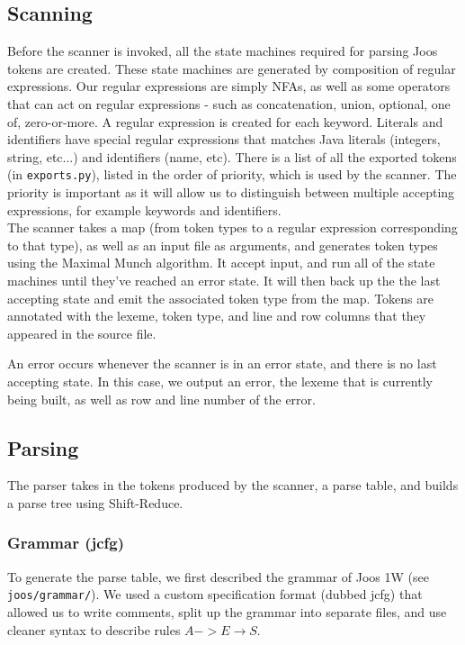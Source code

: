 \documentclass[12pt, a4paper]{article}
\begin{document}
\subsection{Scanning}

Before the scanner is invoked, all the state machines required for parsing Joos tokens are created. These state machines are generated by composition of regular expressions. Our regular expressions are simply NFAs, as well as some operators that can act on regular expressions - such as concatenation, union, optional, one of, zero-or-more. A regular expression is created for each keyword. Literals and identifiers have special regular expressions that matches Java literals (integers, string, etc...) and identifiers (name, etc). There is a list of all the exported tokens (in \verb|exports.py|), listed in the order of priority, which is used by the scanner. The priority is important as it will allow us to distinguish between multiple accepting expressions, for example keywords and identifiers. \\

The scanner takes a map (from token types to a regular expression corresponding to that type), as well as an input file as arguments, and generates token types using the Maximal Munch algorithm. It accept input, and run all of the state machines until they've reached an error state. It will then back up the the last accepting state and emit the associated token type from the map. Tokens are annotated with the lexeme, token type, and line and row columns that they appeared in the source file.

An error occurs whenever the scanner is in an error state, and there is no last accepting state. In this case, we output an error, the lexeme that is currently being built, as well as row and line number of the error.

\subsection{Parsing}

The parser takes in the tokens produced by the scanner, a parse table, and builds a parse tree using Shift-Reduce.

\subsubsection{Grammar (jcfg)}
To generate the parse table, we first described the grammar of Joos 1W (see \verb|joos/grammar/|). We used a custom specification format (dubbed jcfg) that allowed us to write comments, split up the grammar into separate files, and use cleaner syntax to describe rules $A -> E \rightarrow S$. \\
\end{document}
